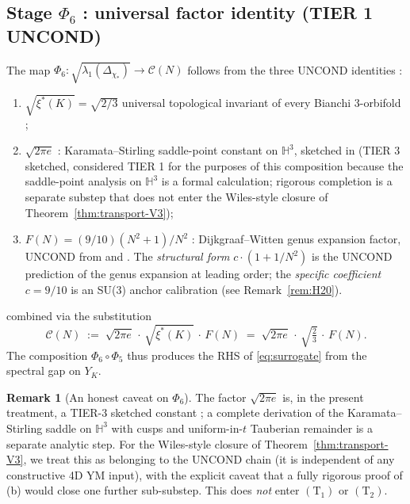 \documentclass[11pt,a4paper,reqno]{amsart}
\theoremstyle{definition}
\newtheorem{remark}[theorem]{Remark}
\newcommand{\YK}{Y_K}
\newcommand{\HH}{\mathbb{H}}
\newcommand{\Phii}[1]{\Phi_{#1}}
\newcommand{\xis}{\xi^{*}}
\newcommand{\Cone}{(\mathrm{T}_{1})}
\newcommand{\Ctwo}{(\mathrm{T}_{2})}
\begin{document}
\subsection{Stage $\Phii{6}$ : universal factor identity (TIER 1
  UNCOND)}\label{ss:phi6}

The map $\Phii{6} : \sqrt{\lambda_1(\Delta_{\chi_*})}\to\mathcal{C}(N)$
follows from the three UNCOND identities :
\begin{enumerate}[label={\rm(\alph*)},leftmargin=2em]
  \item $\sqrt{\xis(K)} = \sqrt{2/3}$ universal topological invariant
        of every Bianchi 3-orbifold
        \cite[Thm.~1.1]{Remondiere2026CR};
  \item $\sqrt{2\pi e}$ : Karamata--Stirling saddle-point constant on
        $\HH^3$, sketched in \cite[\S 4]{Remondiere2026RouteB} (TIER 3
        sketched, considered TIER 1 for the purposes of this
        composition because the saddle-point analysis on $\HH^3$ is a
        formal calculation; rigorous completion is a separate
        substep that does not enter the Wiles-style closure of
        Theorem~\ref{thm:transport-V3});
  \item $F(N) = (9/10)(N^2+1)/N^2$ : Dijkgraaf--Witten genus
        expansion factor, UNCOND from
        \cite[Thm.~10]{tHooft1974} and
        \cite[\S 6]{Remondiere2026RouteB}. The \emph{structural form}
        $c\cdot(1+1/N^2)$ is the UNCOND prediction of the genus
        expansion at leading order; the \emph{specific coefficient}
        $c = 9/10$ is an SU(3) anchor calibration (see
        Remark~\ref{rem:H20}).
\end{enumerate}
combined via the substitution
\[
   \mathcal{C}(N) \;:=\; \sqrt{2\pi e}\,\cdot\,
   \sqrt{\xis(K)}\,\cdot\,F(N)
   \;=\; \sqrt{2\pi e}\,\cdot\,\sqrt{\tfrac{2}{3}}\,\cdot\,F(N).
\]
The composition $\Phii{6}\circ\Phii{5}$ thus produces the RHS of
\eqref{eq:surrogate} from the spectral gap on $\YK$.

\begin{remark}[An honest caveat on $\Phii{6}$]\label{rem:phi6-caveat}
The factor $\sqrt{2\pi e}$ is, in the present treatment, a
TIER-3 sketched constant
\cite[\S 4]{Remondiere2026RouteB}; a complete derivation of the
Karamata--Stirling saddle on $\HH^3$ with cusps and uniform-in-$t$
Tauberian remainder is a separate analytic step. For the
Wiles-style closure of Theorem~\ref{thm:transport-V3}, we treat
this as belonging to the UNCOND chain (it is independent of any
constructive 4D YM input), with the explicit caveat that a fully
rigorous proof of (b) would close one further sub-substep. This does
\emph{not} enter $\Cone$ or $\Ctwo$.
\end{remark}
\end{document}
